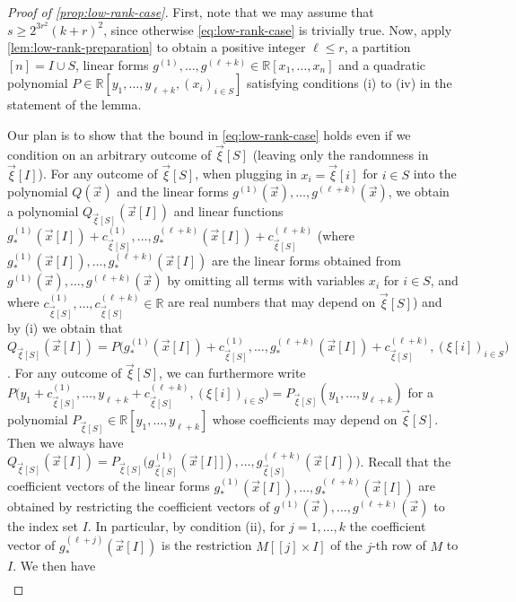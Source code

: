 \documentclass[english]{article}
\theoremstyle{remark}
\numberwithin{equation}{section}
\numberwithin{figure}{section}
\newcommand{\RR}{\mathbb{R}}
\begin{document}
\begin{proof}[Proof of \cref{prop:low-rank-case}]
First, note that we may assume that $s\ge 2^{3r^2}(k+r)^2$, since otherwise \cref{eq:low-rank-case} is trivially true. Now, apply \cref{lem:low-rank-preparation} to obtain a positive integer $\ell\le r$, a partition $[n]=I\cup S$, linear forms $g^{(1)},\dots,g^{(\ell+k)}\in \mathbb{R}[x_1,\dots,x_n]$ and a quadratic polynomial $P\in \mathbb{R}[y_1,\dots,y_{\ell+k}, (x_i)_{i\in S}]$ satisfying conditions (i) to (iv) in the statement of the lemma.

Our plan is to show that the bound in \cref{eq:low-rank-case} holds even if we condition on an arbitrary outcome of $\vec \xi[S]$ (leaving only the randomness in $\vec \xi[I]$).
For any outcome of $\vec \xi[S]$, when plugging in $x_i=\vec{\xi}[i]$ for $i\in S$ into the polynomial $Q(\vec x)$ and the linear forms $g^{(1)}(\vec x),\dots,g^{({\ell+k})}(\vec x)$, we obtain a polynomial $Q_{\vec \xi[S]}(\vec x[I])$ and linear functions $g^{(1)}_{*}(\vec x[I])+c^{(1)}_{\vec \xi[S]},\dots,g^{({\ell+k})}_{*}(\vec x[I])+c^{(\ell+k)}_{\vec \xi[S]}$ (where $g^{(1)}_{*}(\vec x[I]),\dots,g^{({\ell+k})}_{*}(\vec x[I])$ are the linear forms obtained from $g^{(1)}(\vec x),\dots,g^{({\ell+k})}(\vec x)$ by omitting all terms with variables $x_i$ for $i\in S$, and where $c^{(1)}_{\vec \xi[S]},\dots,c^{({\ell+k})}_{\vec \xi[S]}\in \RR$ are real numbers that may depend on $\vec \xi[S]$) and by (i) we obtain that $Q_{\vec \xi[S]}(\vec{x}[I])=P\bigl(g^{(1)}_{*}(\vec x[I])+c^{(1)}_{\vec \xi[S]},\dots,g^{({\ell+k})}_{*}(\vec x[I])+c^{(\ell+k)}_{\vec \xi[S]}, (\xi[i])_{i\in S}\bigr)$. For any outcome of $\vec \xi[S]$, we can furthermore write $P\bigl(y_1+c^{(1)}_{\vec \xi[S]},\dots,y_{\ell+k}+c^{(\ell+k)}_{\vec \xi[S]},(\xi[i])_{i\in S}\bigr)=P_{\vec \xi[S]}(y_1,\dots,y_{\ell+k})$ for a polynomial $P_{\vec \xi[S]}\in \RR[y_1,\dots,y_{\ell+k}]$ whose coefficients may depend on $\vec \xi[S]$. Then we always have $Q_{\vec \xi[S]}(\vec{x}[I])=P_{\vec \xi[S]}\bigl(g^{(1)}_{\vec \xi[S]}(\vec{x}[I]]),\dots,g^{({\ell+k})}_{\vec \xi[S]}(\vec{x}[I])\bigr)$. Recall that the coefficient vectors of the linear forms $g^{(1)}_{*}(\vec x[I]),\dots,g^{({\ell+k})}_{*}(\vec x[I])$ are obtained by restricting the coefficient vectors of $g^{(1)}(\vec x),\dots,g^{({\ell+k})}(\vec x)$ to the index set $I$. In particular, by condition (ii), for $j=1,\dots,k$ the coefficient vector of $g^{({\ell+j})}_{*}(\vec x[I])$ is the restriction $M[[j]\times I]$ of the $j$-th row of $M$ to $I$. We then have
\begin{align*}

\end{align*}
\end{proof}
\end{document}
